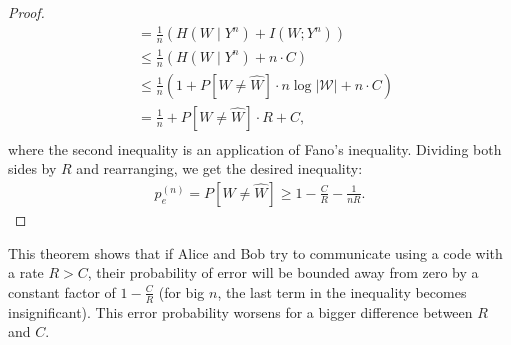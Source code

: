 \begin{proof}
\begin{align}
&= \frac{1}{n} \left( H(W \mid Y^n) + I(W;Y^n)\right) \nonumber\\
&\leq \frac{1}{n} \left( H(W \mid Y^n) + n \cdot C\right) \nonumber\\
&\leq \frac{1}{n} \left( 1 + P[W \neq \hat{W}] \cdot n \log |\mathcal{W}| + n \cdot C\right) \nonumber\\
&= \frac{1}{n} + P[W \neq \hat{W}] \cdot R + C, \nonumber\\
\end{align}
where the second inequality is an application of Fano's inequality. Dividing both sides by $R$ and rearranging, we get the desired inequality:
\begin{align}
p_e^{(n)} = P[W \neq \hat{W}] \geq 1 - \frac{C}{R} - \frac{1}{nR}.
\end{align}
\end{proof}
This theorem shows that if Alice and Bob try to communicate using a code with a rate $R > C$, their probability of error will be bounded away from zero by a constant factor of $1 - \frac{C}{R}$ (for big $n$, the last term in the inequality becomes insignificant). This error probability worsens for a bigger difference between $R$ and $C$.



